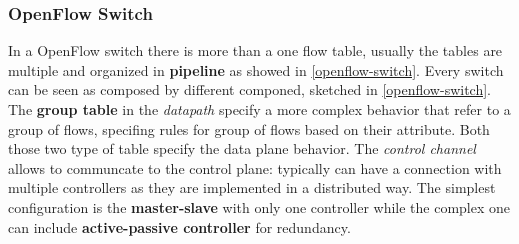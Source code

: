 \documentclass[10pt,a4paper]{report}
\theoremstyle{definition}
\begin{document}
\subsubsection{OpenFlow Switch}\label{sec:openflow-switch}
In a OpenFlow switch there is more than a one flow table, usually the tables are multiple and organized in \textbf{pipeline} as showed in \ref{openflow-switch}. Every switch can be seen as composed by different componed, sketched in \ref{openflow-switch}. The \textbf{group table} in the \textit{datapath} specify a more complex behavior that refer to a group of flows, specifing rules for group of flows based on their attribute. Both those two type of table specify the data plane behavior.
The \textit{control channel} allows to communcate to the control plane: typically can have a connection with multiple controllers as they are implemented in a distributed way. The simplest configuration is the \textbf{master-slave} with only one controller while the complex one can include \textbf{active-passive controller} for redundancy.
\end{document}
